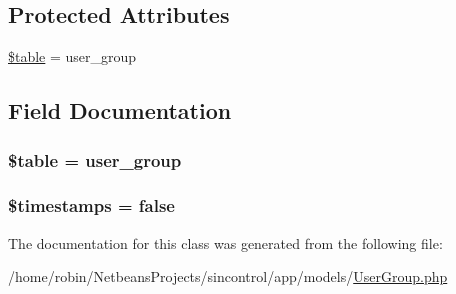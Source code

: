 \subsection*{Protected Attributes}
\begin{DoxyCompactItemize}
\item 
\hyperlink{class_user_group_ae8876a14058f368335baccf35af4a22b}{\$table} = \textquotesingle{}user\+\_\+group\textquotesingle{}
\end{DoxyCompactItemize}


\subsection{Field Documentation}
\hypertarget{class_user_group_ae8876a14058f368335baccf35af4a22b}{}
\subsubsection[{\$table}]{\setlength{\rightskip}{0pt plus 5cm}\$table = \textquotesingle{}user\+\_\+group\textquotesingle{}\hspace{0.3cm}{\ttfamily [protected]}}\label{class_user_group_ae8876a14058f368335baccf35af4a22b}
\hypertarget{class_user_group_a51267c24c8fae742ed8f9be0ba6085ee}{}
\subsubsection[{\$timestamps}]{\setlength{\rightskip}{0pt plus 5cm}\$timestamps = false}\label{class_user_group_a51267c24c8fae742ed8f9be0ba6085ee}


The documentation for this class was generated from the following file\+:\begin{DoxyCompactItemize}
\item 
/home/robin/\+Netbeans\+Projects/sincontrol/app/models/\hyperlink{_user_group_8php}{User\+Group.\+php}\end{DoxyCompactItemize}
